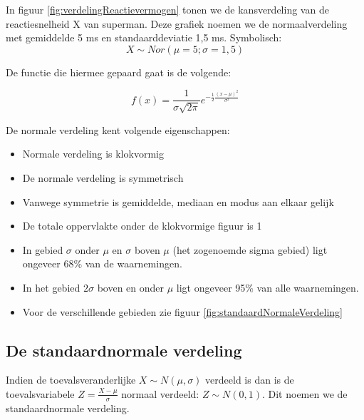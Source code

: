 In figuur \ref{fig:verdelingReactievermogen} tonen we de kansverdeling van de reactiesnelheid X van superman. Deze grafiek noemen we de normaalverdeling met gemiddelde 5 ms en standaarddeviatie 1,5 ms. Symbolisch:
\[ X  \sim Nor(\mu = 5; \sigma = 1,5) \]

De functie die hiermee gepaard gaat is de volgende:

\begin{equation}
  f(x) = \frac{1}{\sigma \sqrt{2\pi}} e^{-\frac{1}{2} \frac{(x - \mu)^{2}}{\sigma^{2}}}
  \label{eq:normalFunction}
\end{equation}

De normale verdeling kent volgende eigenschappen:
\begin{itemize}
  \item Normale verdeling is klokvormig
  \item De normale verdeling is symmetrisch
  \item Vanwege symmetrie is gemiddelde, mediaan en modus aan elkaar gelijk
  \item De totale oppervlakte onder de klokvormige figuur is 1
  \item In gebied $\sigma$ onder $\mu$ en $\sigma$ boven $\mu$ (het zogenoemde sigma gebied) ligt ongeveer 68\% van de waarnemingen.
  \item In het gebied $2\sigma$ boven en onder $\mu$ ligt ongeveer 95\% van alle waarnemingen.
  \item Voor de verschillende gebieden zie figuur \ref{fig:standaardNormaleVerdeling}
\end{itemize}

\subsection{De standaardnormale verdeling}

Indien de toevalsveranderlijke $X \sim N(\mu,\sigma)$ verdeeld is dan is de toevalsvariabele $Z = \frac{X - \mu}{\sigma}$ normaal verdeeld: $Z \sim N(0,1)$. Dit noemen we de standaardnormale verdeling.

